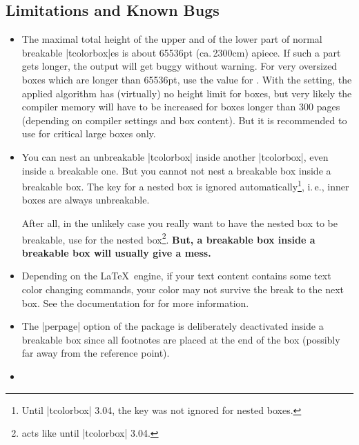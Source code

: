 \subsection{Limitations and Known Bugs}
\begin{itemize}
\item  The maximal total height of the upper and of the lower part
  of normal breakable |tcolorbox|es is about 65536pt (ca.\,2300cm)
  apiece. If such a part gets longer, the output will get buggy
  without warning.
  For very oversized boxes which are longer than 65536pt, use
  the  value for  .
  With the  setting,
  the applied algorithm has (virtually) no height limit for boxes, but
  very likely the compiler memory will have to be increased for boxes longer
  than 300 pages (depending on compiler settings and box content).
  But it is recommended to use  for critical large boxes only.
\item You can nest an unbreakable |tcolorbox| inside another |tcolorbox|,
  even inside a breakable one.
  But you cannot not nest a breakable box inside a breakable box.
  The  key for a nested box is ignored
  automatically\footnote{Until |tcolorbox| 3.04, the  key
  was not ignored for nested boxes.}, i.\,e., inner
  boxes are always unbreakable.\par
  After all, in the unlikely case you really want to have the nested box to be breakable,
  use  for the nested
  box\footnote{ acts like  until |tcolorbox| 3.04.}.
  \textbf{But, a breakable box inside a breakable box will usually give a mess.}
\item{}
  Depending on the \LaTeX\ engine, if your text content contains some text
  color changing commands, your color may not survive the break to the next box.
  See the documentation for  for more information.
\item{}
  The |perpage| option of the  package is deliberately deactivated
  inside a breakable box since all footnotes are placed at the end
  of the box (possibly far away from the reference point).
\item{}

\end{itemize}
